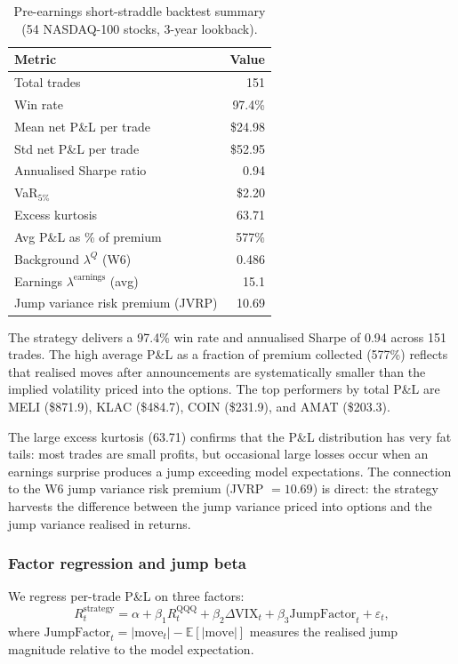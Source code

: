 \documentclass[12pt]{article}
\begin{document}
\begin{table}[h]
\centering
\caption{Pre-earnings short-straddle backtest summary
         (54 NASDAQ-100 stocks, 3-year lookback).}
\label{tab:w8_backtest}
\begin{tabular}{lr}
\hline
Metric & Value \\
\hline
Total trades & 151 \\
Win rate & 97.4\% \\
Mean net P\&L per trade & \$24.98 \\
Std net P\&L per trade & \$52.95 \\
Annualised Sharpe ratio & 0.94 \\
VaR$_{5\%}$ & \$2.20 \\
Excess kurtosis & 63.71 \\
Avg P\&L as \% of premium & 577\% \\
Background $\lambda^Q$ (W6) & 0.486 \\
Earnings $\lambda^{\mathrm{earnings}}$ (avg) & 15.1 \\
Jump variance risk premium (JVRP) & 10.69 \\
\hline
\end{tabular}
\end{table}

The strategy delivers a 97.4\% win rate and annualised Sharpe of 0.94
across 151 trades.
The high average P\&L as a fraction of premium collected (577\%) reflects
that realised moves after announcements are systematically smaller than
the implied volatility priced into the options.
The top performers by total P\&L are MELI (\$871.9), KLAC (\$484.7),
COIN (\$231.9), and AMAT (\$203.3).

The large excess kurtosis (63.71) confirms that the P\&L distribution has
very fat tails: most trades are small profits, but occasional large losses
occur when an earnings surprise produces a jump exceeding model expectations.
The connection to the W6 jump variance risk premium (JVRP $= 10.69$) is
direct: the strategy harvests the difference between the jump variance
priced into options and the jump variance realised in returns.

\subsubsection*{Factor regression and jump beta}

We regress per-trade P\&L on three factors:
\[
  R^{\mathrm{strategy}}_t
  = \alpha
  + \beta_1 R^{\mathrm{QQQ}}_t
  + \beta_2 \Delta\mathrm{VIX}_t
  + \beta_3 \mathrm{JumpFactor}_t
  + \varepsilon_t,
\]
where $\mathrm{JumpFactor}_t = |\mathrm{move}_t| - \mathbb{E}[|\mathrm{move}|]$
measures the realised jump magnitude relative to the model expectation.
\end{document}
